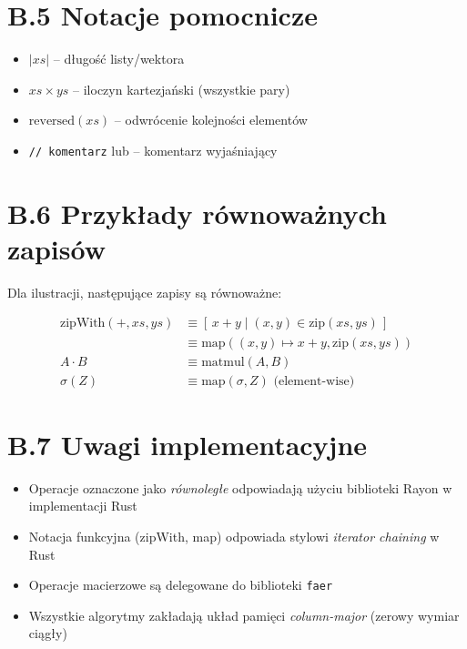 \section*{B.5 Notacje pomocnicze}

\begin{itemize}
	\item $|xs|$ -- długość listy/wektora
	\item $xs \times ys$ -- iloczyn kartezjański (wszystkie pary)
	\item $\text{reversed}(xs)$ -- odwrócenie kolejności elementów
	\item \texttt{// komentarz} lub  -- komentarz wyjaśniający
\end{itemize}

\section*{B.6 Przykłady równoważnych zapisów}

Dla ilustracji, następujące zapisy są równoważne:

\begin{align*}
	\text{zipWith}(+, xs, ys) & \equiv [\, x + y \mid (x,y) \in \text{zip}(xs, ys) \,]   \\
	                          & \equiv \text{map}((x,y) \mapsto x+y, \text{zip}(xs, ys)) \\
	A \cdot B                 & \equiv \text{matmul}(A, B)                               \\
	\sigma(Z)                 & \equiv \text{map}(\sigma, Z) \text{ (element-wise)}
\end{align*}

\section*{B.7 Uwagi implementacyjne}

\begin{itemize}
	\item Operacje oznaczone jako \emph{równoległe} odpowiadają użyciu biblioteki Rayon w implementacji Rust
	\item Notacja funkcyjna (zipWith, map) odpowiada stylowi \emph{iterator chaining} w Rust
	\item Operacje macierzowe są delegowane do biblioteki \texttt{faer}
	\item Wszystkie algorytmy zakładają układ pamięci \emph{column-major} (zerowy wymiar ciągły)
\end{itemize}


